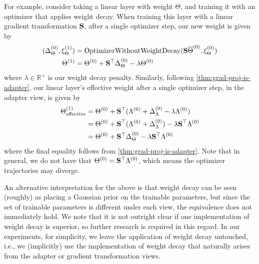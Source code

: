 For example, consider taking a linear layer with weight $\Theta$, and training it with an optimizer that applies weight decay.
When training this layer with a linear gradient transformation ${\mathbf{S}}$, after a single optimizer step, our new weight is given by
\begin{align}
   (\Delta_{\Theta}^{(0)}, \xi_{\Theta}^{(1)}) &= \text{OptimizerWithoutWeightDecay}( {\mathbf{S}} \overline{\Theta}^{(0)}, \xi_{\Theta}^{(0)}) \\
   \Theta^{(1)} &= \Theta^{(0)} + {\mathbf{S}}^\top \Delta_{\Theta}^{(0)} - \lambda \Theta^{(0)}
\end{align}
where $\lambda \in \mathbb{R}^{+}$ is our weight decay penalty.
Similarly, following \cref{thm:grad-proj-is-adapter}, our linear layer's effective weight after a single optimizer step, in the adapter view, is given by 
\begin{align}
   \Theta_\text{effective}^{(1)} &= \Theta^{(0)} + {\mathbf{S}}^\top (\Lambda^{(0)} + \Delta_{\Lambda}^{(0)} - \lambda \Lambda^{(0)}) \\
   &= \Theta^{(0)} + {\mathbf{S}}^\top (\Lambda^{(0)} + \Delta_{\Lambda}^{(0)}) - \lambda {\mathbf{S}}^\top \Lambda^{(0)} \\
   &= \Theta^{(0)} + {\mathbf{S}}^\top \Delta_{\Theta}^{(0)} - \lambda {\mathbf{S}}^\top \Lambda^{(0)}
\end{align}
where the final equality follows from \cref{thm:grad-proj-is-adapter}.
Note that in general, we do not have that $\Theta^{(0)} = {\mathbf{S}}^\top \Lambda^{(0)}$, which means the optimizer trajectories may diverge.

An alternative interpretation for the above is that weight decay can be seen (roughly) as placing a Gaussian prior on the trainable parameters, but since the set of trainable parameters is different under each view, the equivalence does not immediately hold.
We note that it is not outright clear if one implementation of weight decay is superior, so further research is required in this regard.
In our experiments, for simplicity, we leave the application of weight decay untouched, i.e., we (implicitly) use the implementation of weight decay that naturally arises from the adapter or gradient transformation views.

